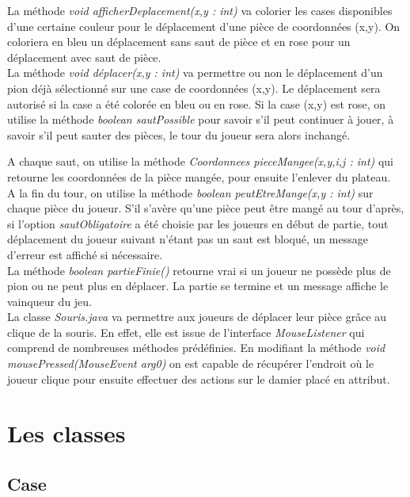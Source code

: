 \documentclass[12,french]{report}
\begin{document}
La méthode \textit{void afficherDeplacement(x,y : int)} va colorier les cases disponibles d'une certaine couleur pour le déplacement d'une pièce de coordonnées (x,y). On coloriera en bleu un déplacement sans saut de pièce et en rose pour un déplacement avec saut de pièce.\\



La méthode \textit{void déplacer(x,y : int)} va permettre ou non le déplacement d'un pion déjà sélectionné sur une case de coordonnées (x,y). Le déplacement sera autorisé si la case a été colorée en bleu ou en rose. Si la case (x,y) est rose, on utilise la méthode \textit{boolean sautPossible} pour savoir s'il peut continuer à jouer, à savoir s'il peut sauter des pièces, le tour du joueur sera alors inchangé.

A chaque saut, on utilise la méthode \textit{Coordonnees pieceMangee(x,y,i,j : int)} qui retourne les coordonnées de la pièce mangée, pour ensuite l'enlever du plateau.\\

A la fin du tour, on utilise la méthode \textit{boolean peutEtreMange(x,y : int)} sur chaque pièce du joueur. S'il s'avère qu'une pièce peut être mangé au tour d'après, si l'option \textit{sautObligatoire} a été choisie par les joueurs en début de partie, tout déplacement du joueur suivant n'étant pas un saut est bloqué, un message d'erreur est affiché si nécessaire.\\

La méthode \textit{boolean partieFinie()} retourne vrai si un joueur ne possède plus de pion ou ne peut plus en déplacer. La partie se termine et un message affiche le vainqueur du jeu.\\

La classe \textit{Souris.java} va permettre aux joueurs de déplacer leur pièce grâce au clique de la souris. En effet, elle est issue de l'interface \textit{MouseListener} qui comprend de nombreuses méthodes prédéfinies. En modifiant la méthode \textit{void mousePressed(MouseEvent arg0)} on est capable de récupérer l'endroit où le joueur clique pour ensuite effectuer des actions sur le damier placé en attribut.


\chapter{Les classes}

\section{Case}
\end{document}

